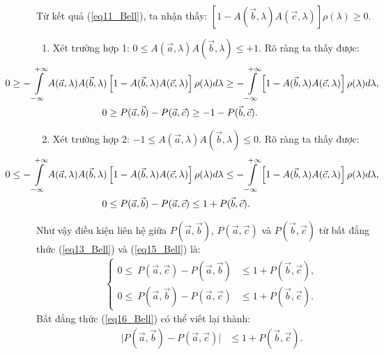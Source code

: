 \begin{enumerate}
\begin{enumerate}[label=\textbf{\alph*,}]
\begin{enumerate}
Từ kết quả (\ref{eq11_Bell}), ta nhận thấy: $\left[1-A(\Vec{b},\lambda)A(\Vec{c},\lambda)\right]\rho(\lambda) \geq 0$. \\
\begin{enumerate}
\item Xét trường hợp 1: $0 \leq A(\Vec{a},\lambda)A(\Vec{b},\lambda) \leq + 1$. Rõ ràng ta thấy được:
\begin{align}
    \label{eq12_Bell}
    \hspace{-2cm} 0\geq -\displaystyle\int\limits_{-\infty}^{+\infty}A(\Vec{a},\lambda)A(\Vec{b},\lambda)&\left[ 1-A(\Vec{b},\lambda)A(\Vec{c},\lambda)\right]\rho(\lambda)d\lambda \geq -\displaystyle\int\limits_{-\infty}^{+\infty}\left[1-A(\Vec{b},\lambda)A(\Vec{c},\lambda)\right]\rho(\lambda)d\lambda, \\
    \label{eq13_Bell}
    0& \geq P(\Vec{a},\Vec{b})-P(\Vec{a},\Vec{c}) \geq - 1 - P(\Vec{b},\Vec{c}).
\end{align}
\item Xét trường hợp 2: $-1 \leq A(\Vec{a},\lambda)A(\Vec{b},\lambda) \leq 0$. Rõ ràng ta thấy được:
\begin{align}
    \label{eq14_Bell}
    \hspace{-2cm} 0\leq -\displaystyle\int\limits_{-\infty}^{+\infty}A(\Vec{a},\lambda)A(\Vec{b},\lambda)&\left[ 1-A(\Vec{b},\lambda)A(\Vec{c},\lambda)\right]\rho(\lambda)d\lambda \leq -\displaystyle\int\limits_{-\infty}^{+\infty}\left[1-A(\Vec{b},\lambda)A(\Vec{c},\lambda)\right]\rho(\lambda)d\lambda, \\
    \label{eq15_Bell}
    0& \leq P(\Vec{a},\Vec{b})-P(\Vec{a},\Vec{c}) \leq  1 + P(\Vec{b},\Vec{c}).
\end{align}
\end{enumerate}
Như vậy điều kiện liên hệ giữa $P(\Vec{a},\Vec{b})$, $P(\Vec{a},\Vec{c})$ và $P(\Vec{b},\Vec{c})$ từ bất đẳng thức (\ref{eq13_Bell}) và (\ref{eq15_Bell}) là:
\begin{align} \label{eq16_Bell}
    \begin{cases}
    0\leq \ P(\Vec{a},\Vec{c})-P(\Vec{a},\Vec{b})&\leq  1 + P(\Vec{b},\Vec{c}),\\
    0\leq \ P(\Vec{a},\Vec{b})-P(\Vec{a},\Vec{c})&\leq  1 + P(\Vec{b},\Vec{c}).
    \end{cases}
\end{align}
Bất đẳng thức (\ref{eq16_Bell}) có thể viết lại thành:
\begin{align} \label{eq17_Bell}
    \big|P(\Vec{a},\Vec{b})-P(\Vec{a},\Vec{c})\big|&\leq  1 + P(\Vec{b},\Vec{c}).

\end{align}
\end{enumerate}
\end{enumerate}
\end{enumerate}
